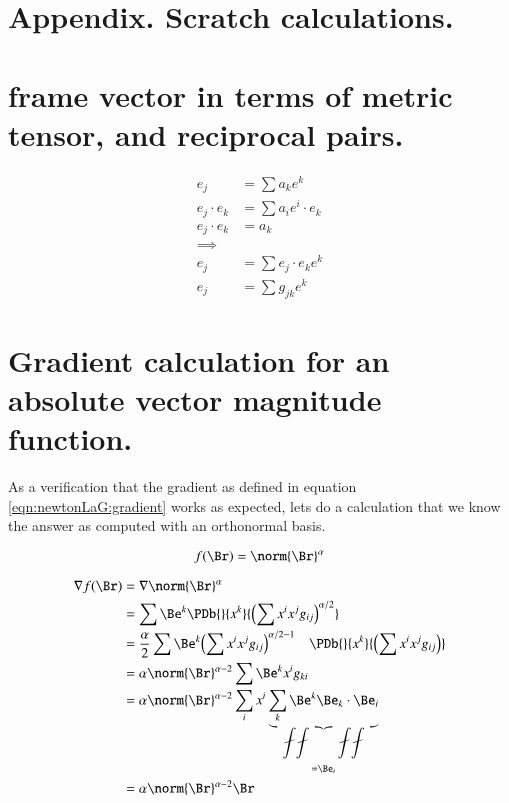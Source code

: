\section{Appendix.  Scratch calculations. }

\section{frame vector in terms of metric tensor, and reciprocal pairs. }

\begin{align*}
e_j &= \sum a_k e^k \\
e_j \cdot e_k &= \sum a_i e^i \cdot e_k \\
e_j \cdot e_k &= a_k \\
\implies & \\
e_j &= \sum e_j \cdot e_k e^k \\
e_j &= \sum g_{jk} e^k
\end{align*}

\section{Gradient calculation for an absolute vector magnitude function. }

As a verification that the gradient as defined in equation \ref{eqn:newtonLaG:gradient} works as expected, lets do a calculation that we know the answer as computed with an
orthonormal basis.

\begin{equation*}
f(\Br) = \norm{\Br}^\alpha
\end{equation*}

\begin{align*}
\grad f(\Br) 
&= \grad \norm{\Br}^\alpha \\
&= \sum \Be^k \PDb{} {x^k} {{\left(\sum x^i x^j g_{ij}\right)}^{\alpha/2}} \\
&= \frac{\alpha}{2} \sum \Be^k {{\left(\sum x^i x^j g_{ij}\right)}^{\alpha/2 -1}} \quad \PDb{}{x^k} {\left(\sum x^i x^j g_{ij}\right)} \\
&= \alpha \norm{\Br}^{\alpha-2} \sum \Be^k x^i g_{ki} \\
&= \alpha \norm{\Br}^{\alpha-2} \sum_i x^i \underbrace{\sum_k \Be^k \Be_k \cdot \Be_i}_{=\Be_i} \\
&= \alpha \norm{\Br}^{\alpha-2} \Br
\end{align*}
